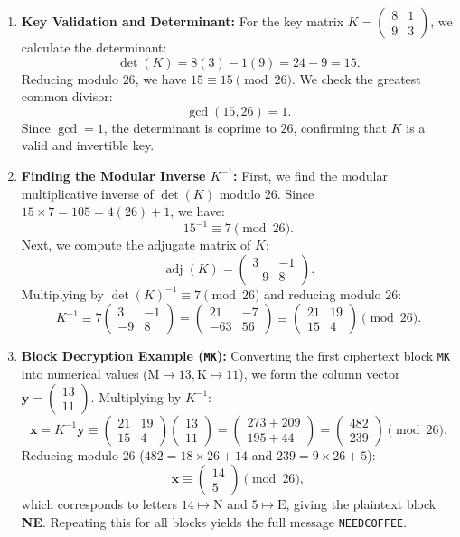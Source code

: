 \documentclass[11pt,a4paper]{article}
\newcommand{\vect}[1]{\begin{pmatrix}#1\end{pmatrix}}
\newcommand{\smat}[1]{\left(\begin{smallmatrix}#1\end{smallmatrix}\right)}
\newcommand{\x}{\mathbf{x}}   %
\newcommand{\y}{\mathbf{y}}   %
\newcommand{\adj}{\operatorname{adj}}
\theoremstyle{plain}
\theoremstyle{definition}
\begin{document}
\begin{enumerate}
    \item \textbf{Key Validation and Determinant:}
    For the key matrix $K = \smat{8&1\\9&3}$, we calculate the determinant:
    \[\det(K) = 8(3) - 1(9) = 24 - 9 = 15.\]
    Reducing modulo $26$, we have $15 \equiv 15 \pmod{26}$. We check the greatest common divisor:
    \[\gcd(15, 26) = 1.\]
    Since $\gcd = 1$, the determinant is coprime to $26$, confirming that $K$ is a valid and invertible key.

    \item \textbf{Finding the Modular Inverse $K^{-1}$:}
    First, we find the modular multiplicative inverse of $\det(K)$ modulo $26$. Since $15 \times 7 = 105 = 4(26) + 1$, we have:
    \[15^{-1} \equiv 7 \pmod{26}.\]
    Next, we compute the adjugate matrix of $K$:
    \[\adj(K) = \begin{pmatrix} 3 & -1 \\ -9 & 8 \end{pmatrix}.\]
    Multiplying by $\det(K)^{-1} \equiv 7 \pmod{26}$ and reducing modulo $26$:
    \[K^{-1} \equiv 7 \begin{pmatrix} 3 & -1 \\ -9 & 8 \end{pmatrix} = \begin{pmatrix} 21 & -7 \\ -63 & 56 \end{pmatrix} \equiv \begin{pmatrix} 21 & 19 \\ 15 & 4 \end{pmatrix} \pmod{26}.\]

    \item \textbf{Block Decryption Example (\texttt{MK}):}
    Converting the first ciphertext block \texttt{MK} into numerical values ($\text{M}\mapsto13, \text{K}\mapsto11$), we form the column vector $\y = \vect{13\\11}$. Multiplying by $K^{-1}$:
    \[\x = K^{-1}\y \equiv \begin{pmatrix} 21 & 19 \\ 15 & 4 \end{pmatrix} \begin{pmatrix} 13 \\ 11 \end{pmatrix} = \begin{pmatrix} 273 + 209 \\ 195 + 44 \end{pmatrix} = \begin{pmatrix} 482 \\ 239 \end{pmatrix} \pmod{26}.\]
    Reducing modulo $26$ ($482 = 18 \times 26 + 14$ and $239 = 9 \times 26 + 5$):
    \[\x \equiv \begin{pmatrix} 14 \\ 5 \end{pmatrix} \pmod{26},\]
    which corresponds to letters $14\mapsto\text{N}$ and $5\mapsto\text{E}$, giving the plaintext block \textbf{NE}. Repeating this for all blocks yields the full message \texttt{NEEDCOFFEE}.
\end{enumerate}
\end{document}
